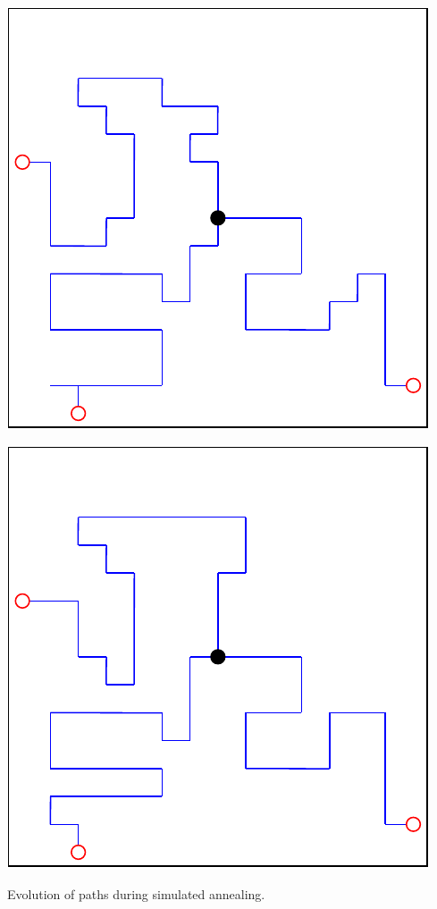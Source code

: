 \begin{center}
\begin{minipage}{.5\textwidth}
    \end{minipage}\\
    \begin{minipage}{.5\textwidth}
        \centering
        \includegraphics[width=0.95\linewidth]{img/SA temp 1.5.pdf}
    \end{minipage}%
    \begin{minipage}{.5\textwidth}
        \centering
        \includegraphics[width=0.95\linewidth]{img/SA final.pdf}
    \end{minipage}
    \caption{Evolution of paths during simulated annealing.}
    \label{fig:simulated-annealing}
\end{center}

